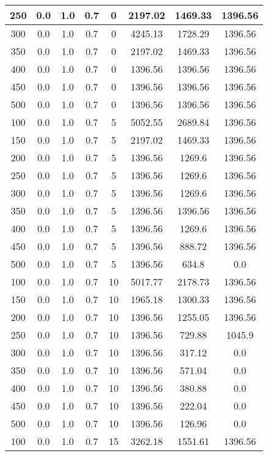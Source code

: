 \documentclass[a4paper, 12pt]{extreport}
\begin{document}
\begin{itemize}
\begin{longtable}{|c|c|c|c|c|c|c|c|}
			250 & 0.0 & 1.0 & 0.7 & 0 & 2197.02 & 1469.33 & 1396.56 \\\hline
			300 & 0.0 & 1.0 & 0.7 & 0 & 4245.13 & 1728.29 & 1396.56 \\\hline
			350 & 0.0 & 1.0 & 0.7 & 0 & 2197.02 & 1469.33 & 1396.56 \\\hline
			400 & 0.0 & 1.0 & 0.7 & 0 & 1396.56 & 1396.56 & 1396.56 \\\hline
			450 & 0.0 & 1.0 & 0.7 & 0 & 1396.56 & 1396.56 & 1396.56 \\\hline
			500 & 0.0 & 1.0 & 0.7 & 0 & 1396.56 & 1396.56 & 1396.56 \\\hline
			100 & 0.0 & 1.0 & 0.7 & 5 & 5052.55 & 2689.84 & 1396.56 \\\hline
			150 & 0.0 & 1.0 & 0.7 & 5 & 2197.02 & 1469.33 & 1396.56 \\\hline
			200 & 0.0 & 1.0 & 0.7 & 5 & 1396.56 & 1269.6 & 1396.56 \\\hline
			250 & 0.0 & 1.0 & 0.7 & 5 & 1396.56 & 1269.6 & 1396.56 \\\hline
			300 & 0.0 & 1.0 & 0.7 & 5 & 1396.56 & 1269.6 & 1396.56 \\\hline
			350 & 0.0 & 1.0 & 0.7 & 5 & 1396.56 & 1396.56 & 1396.56 \\\hline
			400 & 0.0 & 1.0 & 0.7 & 5 & 1396.56 & 1269.6 & 1396.56 \\\hline
			450 & 0.0 & 1.0 & 0.7 & 5 & 1396.56 & 888.72 & 1396.56 \\\hline
			500 & 0.0 & 1.0 & 0.7 & 5 & 1396.56 & 634.8 & 0.0 \\\hline
			100 & 0.0 & 1.0 & 0.7 & 10 & 5017.77 & 2178.73 & 1396.56 \\\hline
			150 & 0.0 & 1.0 & 0.7 & 10 & 1965.18 & 1300.33 & 1396.56 \\\hline
			200 & 0.0 & 1.0 & 0.7 & 10 & 1396.56 & 1255.05 & 1396.56 \\\hline
			250 & 0.0 & 1.0 & 0.7 & 10 & 1396.56 & 729.88 & 1045.9 \\\hline
			300 & 0.0 & 1.0 & 0.7 & 10 & 1396.56 & 317.12 & 0.0 \\\hline
			350 & 0.0 & 1.0 & 0.7 & 10 & 1396.56 & 571.04 & 0.0 \\\hline
			400 & 0.0 & 1.0 & 0.7 & 10 & 1396.56 & 380.88 & 0.0 \\\hline
			450 & 0.0 & 1.0 & 0.7 & 10 & 1396.56 & 222.04 & 0.0 \\\hline
			500 & 0.0 & 1.0 & 0.7 & 10 & 1396.56 & 126.96 & 0.0 \\\hline
			100 & 0.0 & 1.0 & 0.7 & 15 & 3262.18 & 1551.61 & 1396.56 \\\hline

\end{longtable}
\end{itemize}
\end{document}
